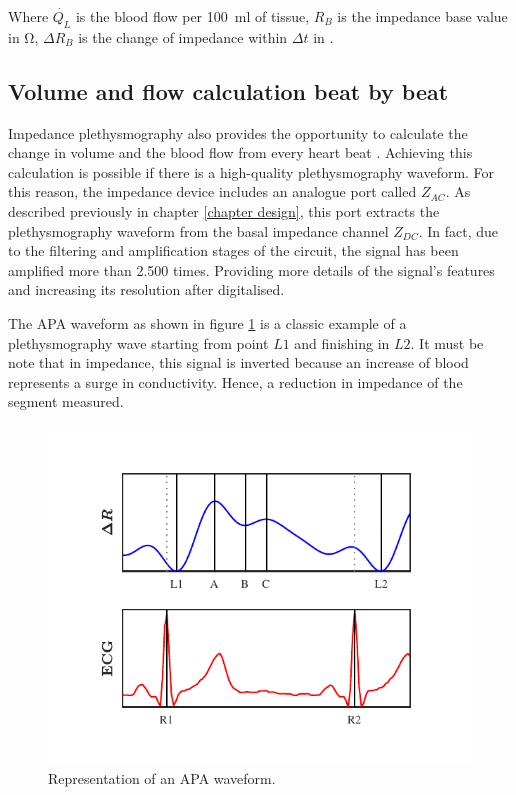 
Where $\dot{Q_L}$ is the blood flow per \SI{100}{\milli\litre} of tissue, $R_B$ is the impedance base value in \si{\ohm}, $\Delta R_B$ is the change of impedance within ${\Delta t}$ in \si{\sec}.

\subsection{Volume and flow calculation beat by beat}
\label{section procedure flow beat}
Impedance plethysmography also provides the opportunity to calculate the change in volume and the blood flow from every heart beat \cite{anderson1984impedance,costeloe1980continuous,mohapatra1981non,golden1986assessment}. Achieving this calculation is possible if there is a high-quality plethysmography waveform. For this reason, the impedance device includes an analogue port called $Z_{AC}$. As described previously in chapter \ref{chapter design}, this port extracts the plethysmography waveform from the basal impedance channel $Z_{DC}$. In fact, due to the filtering and amplification stages of the circuit, the signal has been amplified more than \num{2.500} times. Providing more details of the signal's features and increasing its resolution after digitalised.

The APA waveform as shown in figure \ref{fig:markers APA} is a classic example of a plethysmography wave starting from point $L1$ and finishing in $L2$. It must be note that in impedance, this signal is inverted because an increase of blood represents a surge in conductivity. Hence, a reduction in impedance of the segment measured. 

\begin{figure}[!htpb]
	\centering
	\includegraphics[width=12cm,keepaspectratio]{figure5}
	\caption{Representation of an APA waveform.}
	\label{fig:markers APA}
\end{figure}

